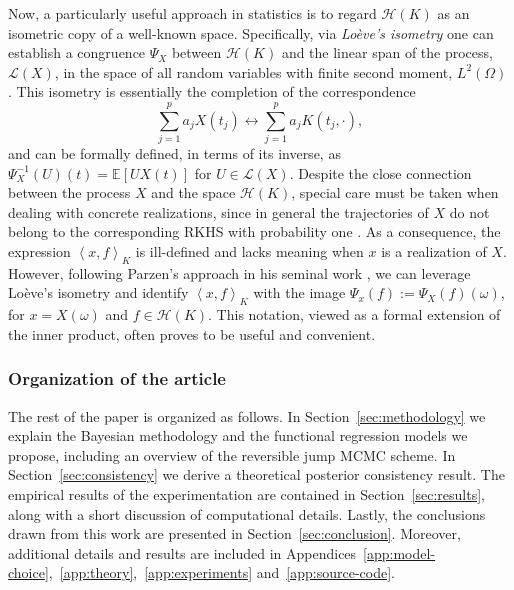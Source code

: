 \documentclass{article}
\numberwithin{equation}{section}
\theoremstyle{plain}
\theoremstyle{definition}
\newcommand{\E}{\mathbb{E}}
\newcommand{\Hcal}{\mathcal{H}}
\newcommand\dotprod[2]{\left\langle#1,#2\right\rangle}
\begin{document}
Now, a particularly useful approach in statistics is to regard \(\Hcal(K)\) as an isometric copy of a well-known space. Specifically, via \textit{Loève's isometry} \citep{loeve1948fonctions} one can establish a congruence \(\Psi_X\) between \(\Hcal(K)\) and the linear span of the process, \(\mathcal L(X)\), in the space of all random variables with finite second moment, \(L^2(\Omega)\) \citep[see Lemma 1.1 in][]{lukic2001stochastic}. This isometry is essentially the completion of the correspondence
\begin{equation*}
  \sum_{j=1}^p a_j X(t_j) \longleftrightarrow \sum_{j=1}^p a_j K(t_j, \cdot),
\end{equation*}
and can be formally defined, in terms of its inverse, as \(\Psi^{-1}_X(U)(t) = \E[U X(t)]\) for \(U \in \mathcal L(X)\).
Despite the close connection between the process \(X\) and the space \(\Hcal(K)\), special care must be taken when dealing with concrete realizations, since in general the trajectories of \(X\) do not belong to the corresponding RKHS with probability one \citep[][Corollary~7.1]{lukic2001stochastic}. As a consequence, the expression \(\dotprod{x}{f}_K\) is ill-defined and lacks meaning when \(x\) is a realization of \(X\). However, following Parzen's approach in his seminal work \citep[][Theorem~4E]{parzen1961approach}, we can leverage Loève's isometry and identify \(\dotprod{x}{f}_K \) with the image \( \Psi_x(f) := \Psi_X(f)(\omega)\), for \(x=X(\omega)\) and \(f\in \Hcal(K)\). This notation, viewed as a formal extension of the inner product, often proves to be useful and convenient.

\subsubsection*{Organization of the article}

The rest of the paper is organized as follows. In Section~\ref{sec:methodology} we explain the Bayesian methodology and the functional regression models we propose, including an overview of the reversible jump MCMC scheme. In Section~\ref{sec:consistency} we derive a theoretical posterior consistency result. The empirical results of the experimentation are contained in Section~\ref{sec:results}, along with a short discussion of computational details. Lastly, the conclusions drawn from this work are presented in Section~\ref{sec:conclusion}. Moreover, additional details and results are included in Appendices~\ref{app:model-choice},~\ref{app:theory},~\ref{app:experiments} and~\ref{app:source-code}.
\end{document}
